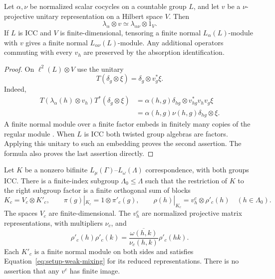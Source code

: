 \begin{lemma}
\label{lem:setup-twisted-absorption}
Let $\alpha,\nu$ be normalized scalar cocycles on a countable group
$L$, and let $v$ be a $\nu$-projective unitary representation on a
Hilbert space $V$.  Then
\[
 \lambda_\alpha\otimes v
       \simeq \lambda_{\alpha\nu}\otimes1_V.
\]
If $L$ is ICC and $V$ is finite-dimensional, tensoring a finite normal
$L_\alpha(L)$-module with $v$ gives a finite normal
$L_{\alpha\nu}(L)$-module.  Any additional operators commuting with
every $v_h$ are preserved by the absorption identification.
\end{lemma}

\begin{proof}
On $\ell^2(L)\otimes V$ use the unitary
\[
 T(\delta_g\otimes\xi)=\delta_g\otimes v_g^*\xi.
\]
Indeed,
\begin{align*}
 T(\lambda_\alpha(h)\otimes v_h)T^*
          (\delta_g\otimes\xi)
 &=\alpha(h,g)\delta_{hg}\otimes v_{hg}^*v_hv_g\xi\\
 &=\alpha(h,g)\nu(h,g)\delta_{hg}\otimes\xi.
\end{align*}
A finite normal module over a finite factor embeds in finitely many
copies of the regular module
\cite[Theorems~10.1.1 and~10.2.1]{Jones2009}.  When $L$ is ICC both twisted group
algebras are factors.  Applying this unitary to such an embedding proves the second
assertion.  The formula also proves the last assertion directly.
\end{proof}

\begin{lemma}
\label{lem:setup-compact-reduction}
Let $K$ be a nonzero bifinite
$L_\mu(\Gamma)$--$L_\omega(\Lambda)$ correspondence, with both groups
ICC.  There is a finite-index subgroup $\Lambda_0\leq\Lambda$ such
that the restriction of $K$ to the right subgroup factor is a finite
orthogonal sum of blocks
\[
 K_c=V_c\otimes K'_c,
 \qquad
 \pi(g)|_{K_c}=1\otimes\pi'_c(g),
 \qquad
 \rho(h)|_{K_c}=v^c_h\otimes\rho'_c(h)
       \quad(h\in\Lambda_0).
\]
The spaces $V_c$ are finite-dimensional.  The $v^c_h$ are normalized
projective matrix representations, with multipliers $\nu_c$, and
\begin{equation}
 \rho'_c(h)\rho'_c(k)
  =\frac{\overline{\omega(h,k)}}{\nu_c(h,k)}\rho'_c(hk).
 \label{eq:setup-reduced-right-multiplier}
\end{equation}
Each $K'_c$ is a finite normal module on both sides and satisfies
Equation~\eqref{eq:setup-weak-mixing} for its reduced representations.
There is no assertion that any $v^c$ has finite image.
\end{lemma}

